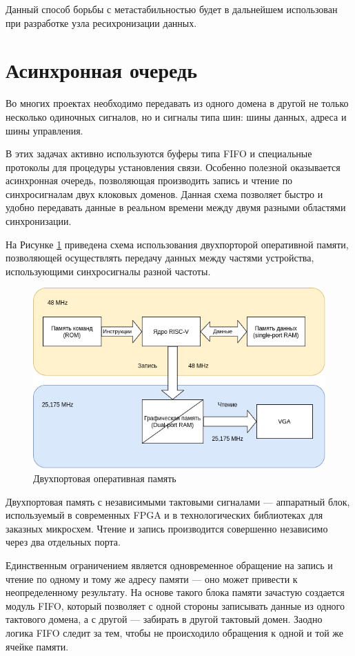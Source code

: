 Данный способ борьбы с метастабильностью будет в дальнейшем использован при разработке узла ресихронизации данных.

\section{Асинхронная очередь}

Во многих проектах необходимо передавать из одного домена в другой не только несколько одиночных сигналов, но и сигналы типа шин: шины данных, адреса и шины управления.

В этих задачах активно используются буферы типа FIFO и специальные протоколы для процедуры установления связи. Особенно полезной оказывается асинхронная очередь, позволяющая производить запись и чтение по синхросигналам двух клоковых доменов.
Данная схема позволяет быстро и удобно передавать данные в реальном времени между двумя разными областями синхронизации.

На Рисунке \ref{fig:async-fifo} приведена схема использования двухпорторой оперативной памяти, позволяющей осуществлять передачу данных между частями устройства, использующими синхросигналы разной частоты.

\begin{figure}[h!]
	\centering
	\includegraphics[width=0.7\linewidth]{course-scheme/images/dual-port-ram}
	\caption{Двухпортовая оперативная память}
	\label{fig:async-fifo}
\end{figure}

Двухпортовая память с независимыми тактовыми сигналами --- аппаратный блок, используемый в современных FPGA и в технологических библиотеках для заказных микросхем. Чтение и запись производится совершенно независимо через два отдельных порта.

Единственным ограничением является одновременное обращение на запись и чтение по одному и тому же адресу памяти --- оно может привести к неопределенному результату. На основе такого блока памяти зачастую создается модуль FIFO, который позволяет с одной стороны записывать данные из одного тактового домена, а с другой — забирать в другой тактовый домен. Заодно логика FIFO следит за тем, чтобы не происходило обращения к одной и той же ячейке памяти.

